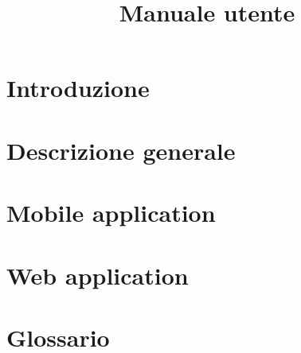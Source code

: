 \documentclass{article}
\title{Manuale utente}
\begin{document}


\section{Introduzione}%
\label{sec:introduzione}


\newpage
\section{Descrizione generale}%
\label{sec:descrizione_generale}


\newpage
\section{Mobile application}%
\label{sec:mobile_application}


\newpage
\section{Web application}%
\label{sec:web_application}


\newpage
\appendix
\section{Glossario}%
\label{sec:glossario}

\end{document}
